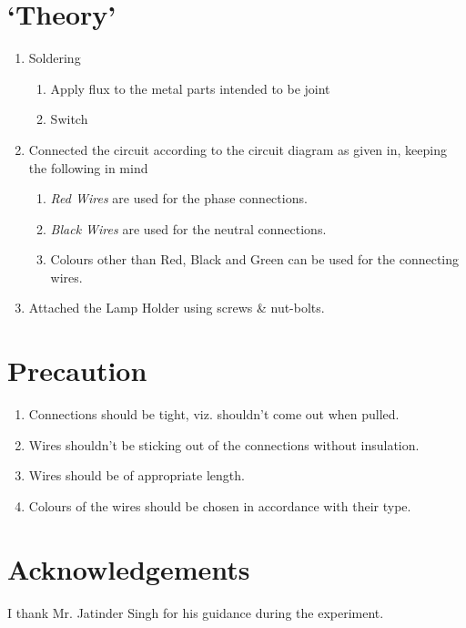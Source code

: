 \section{`Theory'}
	\begin{enumerate}
		\item Soldering
			\begin{enumerate}
				\item Apply flux to the metal parts intended to be joint
				\item Switch
			\end{enumerate} 
		\item Connected the circuit according to the circuit diagram as given in, keeping the following in mind

			\begin{enumerate}
				\item \emph{Red Wires} are used for the phase connections.
				\item \emph{Black Wires} are used for the neutral connections.
				\item Colours other than Red, Black and Green can be used for the connecting wires.
			\end{enumerate}	
		\item Attached the Lamp Holder using screws \& nut-bolts.
	\end{enumerate}
\section{Precaution}
	\begin{enumerate}
		\item Connections should be tight, viz. shouldn't come out when pulled.
		\item Wires shouldn't be sticking out of the connections without insulation.
		\item Wires should be of appropriate length.
		\item Colours of the wires should be chosen in accordance with their type.
	\end{enumerate}	
\section{Acknowledgements}
I thank Mr. Jatinder Singh for his guidance during the experiment.